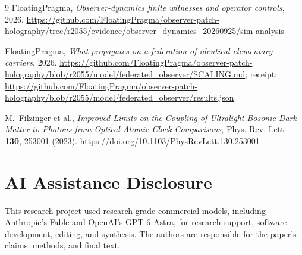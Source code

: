 \documentclass[11pt]{article}
\theoremstyle{remark}
\begin{document}
\begin{thebibliography}{9}
FloatingPragma,
\emph{Observer-dynamics finite witnesses and operator controls}, 2026.
\url{https://github.com/FloatingPragma/observer-patch-holography/tree/r2055/evidence/observer_dynamics_20260925/sim-analysis}

FloatingPragma,
\emph{What propagates on a federation of identical elementary carriers}, 2026.
\url{https://github.com/FloatingPragma/observer-patch-holography/blob/r2055/model/federated_observer/SCALING.md};
receipt: \url{https://github.com/FloatingPragma/observer-patch-holography/blob/r2055/model/federated_observer/results.json}

M.~Filzinger et al.,
\emph{Improved Limits on the Coupling of Ultralight Bosonic Dark Matter to
Photons from Optical Atomic Clock Comparisons},
Phys. Rev. Lett. \textbf{130}, 253001 (2023).
\url{https://doi.org/10.1103/PhysRevLett.130.253001}

\end{thebibliography}

\section*{AI Assistance Disclosure}
This research project used research-grade commercial models, including
Anthropic's Fable and OpenAI's GPT-6 Astra, for research support, software
development, editing, and synthesis. The authors are responsible for the
paper's claims, methods, and final text.
\end{document}
